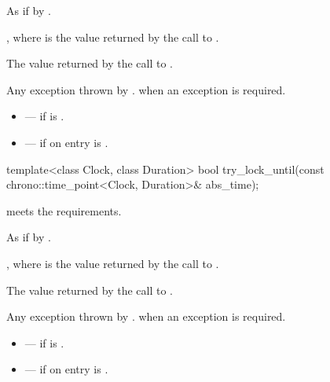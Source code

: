 \begin{itemdescr}
\pnum
\effects
As if by .

\pnum
\ensures
{}, where  is the value returned by
the call to .

\pnum
\returns
The value returned by the call to .

\pnum
\throws
Any exception thrown by .
 when an exception is required.

\pnum
\errors
\begin{itemize}
\item {} --- if  is .
\item {} --- if on entry  is
.
\end{itemize}
\end{itemdescr}

%
\begin{itemdecl}
template<class Clock, class Duration>
  bool try_lock_until(const chrono::time_point<Clock, Duration>& abs_time);
\end{itemdecl}

\begin{itemdescr}
\pnum
\expects
{} meets the 
requirements.

\pnum
\effects
As if by .

\pnum
\ensures
{}, where  is the value returned by
the call to .

\pnum
\returns
The value returned by the call to
.

\pnum
\throws
Any exception thrown by .
 when an exception is required.

\pnum
\errors
\begin{itemize}
\item {} --- if  is .
\item {} --- if on entry  is
.
\end{itemize}
\end{itemdescr}

